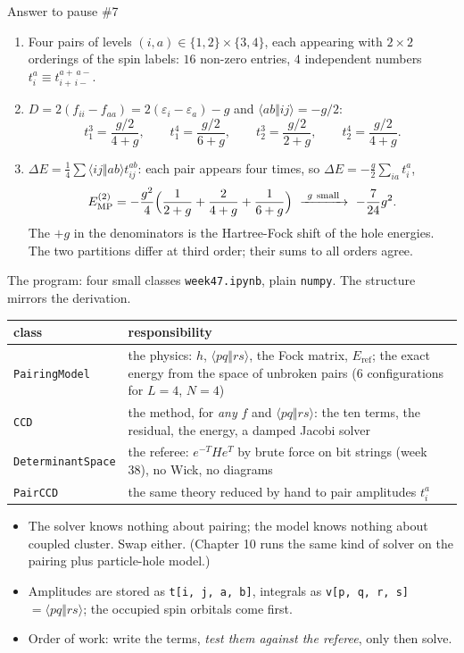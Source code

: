 \documentclass[aspectratio=169,10pt]{beamer}
\newcounter{thinkctr}
\newcommand{\thinka}[1]{%
  \vfill
  \begin{tcolorbox}[enhanced,colback=paleteal,colframe=teal,boxrule=1.2pt,arc=4pt,
    grow to left by=6mm,grow to right by=6mm,
    left=16pt,right=16pt,top=16pt,bottom=18pt,
    fonttitle=\bfseries\Large,fontupper=\large,
    title={Answer to pause \#\thethinkctr}]
  #1
  \end{tcolorbox}
  \vfill}
\newcommand{\Eref}{E_{\mathrm{ref}}}
\newcommand{\as}[4]{\langle #1#2\Vert #3#4\rangle}
\begin{document}
\begin{frame}[shrink=1]{Answer to pause \#7}
\thinka{%
\begin{enumerate}
\item Four pairs of levels $(i,a)\in\{1,2\}\times\{3,4\}$, each appearing with $2\times2$ orderings of the spin labels: $16$ non-zero entries, $4$ independent numbers $t_i^a\equiv t_{i+\,i-}^{a+\,a-}$.
\item $D=2(f_{ii}-f_{aa})=2(\varepsilon_i-\varepsilon_a)-g$ and $\as abij=-g/2$:
\[
 t_1^3=\frac{g/2}{4+g},\qquad t_1^4=\frac{g/2}{6+g},\qquad t_2^3=\frac{g/2}{2+g},\qquad t_2^4=\frac{g/2}{4+g}.
\]
\item $\Delta E=\tfrac14\sum\as ijab t_{ij}^{ab}$: each pair appears four times, so $\Delta E=-\tfrac g2\sum_{ia}t_i^a$,
\[
 E^{(2)}_{\rm MP}=-\frac{g^2}{4}\Bigl(\frac1{2+g}+\frac2{4+g}+\frac1{6+g}\Bigr)
 \ \xrightarrow{\ g\ \text{small}\ }\ -\frac{7}{24}g^2 .
\]
The $+g$ in the denominators is the Hartree-Fock shift of the hole energies. The two partitions differ at third order; their sums to all orders agree.
\end{enumerate}}
\end{frame}

\begin{frame}[shrink=3]{The program: four small classes}
\small
\texttt{week47.ipynb}, plain \texttt{numpy}. The structure mirrors the derivation.
\begin{center}
\renewcommand{\arraystretch}{1.3}
\begin{tabular}{lp{}}
\toprule
class & responsibility\\
\midrule
\texttt{PairingModel} & the physics: $h$, $\as pqrs$, the Fock matrix, $\Eref$; the exact energy from the space of unbroken pairs (6 configurations for $L=4$, $N=4$)\\
\texttt{CCD} & the method, for \emph{any} $f$ and $\as pqrs$: the ten terms, the residual, the energy, a damped Jacobi solver\\
\texttt{DeterminantSpace} & the referee: $e^{-T}He^{T}$ by brute force on bit strings (week 38), no Wick, no diagrams\\
\texttt{PairCCD} & the same theory reduced by hand to pair amplitudes $t_i^a$\\
\bottomrule
\end{tabular}
\end{center}
\begin{itemize}
\item The solver knows nothing about pairing; the model knows nothing about coupled cluster. Swap either. (Chapter 10 runs the same kind of solver on the pairing plus particle-hole model.)
\item Amplitudes are stored as \texttt{t[i, j, a, b]}, integrals as \texttt{v[p, q, r, s]} $=\as pqrs$; the occupied spin orbitals come first.
\item Order of work: write the terms, \emph{test them against the referee}, only then solve.
\end{itemize}
\end{frame}
\end{document}
